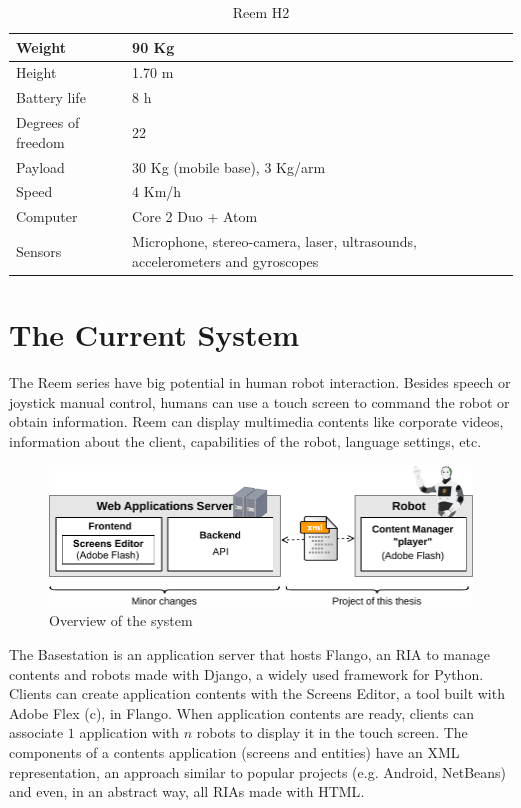 \begin{table}[ht]
    \centering
    \caption{Reem H2}
    \label{tab:rh2}
    \begin{tabularx}{\linewidth}{| X | X |}
    \hline
    Weight & 90 Kg \\ \hline
    Height & 1.70 m \\ \hline
    Battery life & 8 h \\ \hline
    Degrees of freedom & 22 \\ \hline
    Payload & 30 Kg (mobile base), 3 Kg/arm \\ \hline
    Speed & 4 Km/h \\ \hline
    Computer & Core 2 Duo + Atom \\ \hline
    Sensors & Microphone, stereo-camera, laser, ultrasounds, accelerometers and gyroscopes \\
    \hline
    \end{tabularx}
\end{table}


\section{The Current System}
The Reem series have big potential in human robot interaction. 
Besides speech or joystick manual control, humans can use a touch screen to command the robot or obtain information.
Reem can display multimedia contents like corporate videos, information about the client, capabilities of the robot, language settings, etc.

\begin{figure}[htb]
    \label{fig:intro-system-overview}
    \centering
    \includegraphics[width=\textwidth]{figures/intro-system-overview}
    \caption{Overview of the system}
\end{figure}

The Basestation is an application server that hosts Flango, an \ac{RIA} to manage contents and robots made with Django, a widely used framework for Python. 
Clients can create application contents with the Screens Editor, a tool built with Adobe Flex (c), in Flango.
When application contents are ready, clients can associate $1$ application with $n$ robots to display it in the touch screen.
The components of a contents application (screens and entities) have an \ac{XML} representation, an approach similar to popular projects (e.g. Android, NetBeans) and even, in an abstract way, all \acp{RIA} made with \ac{HTML}.

